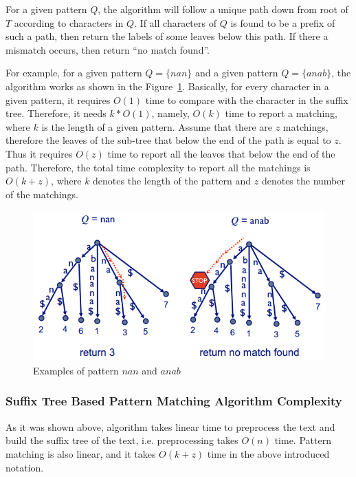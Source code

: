 \documentclass[paper=a4, fontsize=11pt]{scrartcl} %
\numberwithin{equation}{section} %
\numberwithin{figure}{section} %
\numberwithin{table}{section} %
\begin{document}
For a given pattern $Q$, the algorithm will follow a unique path down from root of $T$ according to characters in $Q$. If all characters of $Q$ is found to be a prefix of such a path, then return the labels of some leaves below this path. If there a mismatch occurs, then return ``no match found''.

For example, for a given pattern $Q = \{nan\}$ and a given pattern $Q = \{anab\}$, the algorithm works as shown in the Figure~\ref{fig:suffix-tree-matching-ex}. Basically, for every character in a given pattern, it requires $O(1)$ time to compare with the character in the suffix tree. Therefore, it needs $k*O(1)$, namely, $O(k)$ time to report a matching, where $k$ is the length of a given pattern. Assume that there are $z$ matchings, therefore the leaves of the sub-tree that below the end of the path is equal to $z$. Thus it requires $O(z)$ time to report all the leaves that below the end of the path. Therefore, the total time complexity to report all the matchings is $O(k+z)$, where $k$ denotes the length of the pattern and $z$ denotes the number of the matchings.

\begin{figure}
\begin{center}
\includegraphics[width=5.5in]{figures/example.png}
\caption{Examples of pattern $nan$ and $anab$}
\label{fig:suffix-tree-matching-ex}
\end{center}
\end{figure}

\subsubsection{Suffix Tree Based Pattern Matching Algorithm Complexity}
As it was shown above, algorithm takes linear time to preprocess the text and build the suffix tree of the text, i.e. preprocessing takes $O(n)$ time. Pattern matching is also linear, and it takes $O(k + z)$ time in the above introduced notation.
\end{document}
